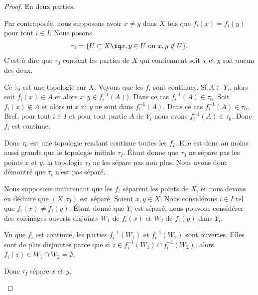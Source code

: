 \begin{proof}
	En deux parties.
	\begin{subproof}
		\spitem[\( \Rightarrow\)]
		Par contraposée, nous supposons avoir \( x\neq y\) dans \( X\) tels que \( f_i(x)=f_i(y)\) pour tout \( i\in I\). Nous posons
		\begin{equation}
			\tau_0=\{ U\subset X\tq x,y\in U\text{ ou }x,y\not\in U \}.
		\end{equation}
		C'est-à-dire que \( \tau_0\) contient les parties de \( X\) qui contiennent soit \( x\) et \( y\) soit aucun des deux.

		Ce \( \tau_0\) est une topologie sur \( X\). Voyons que les \( f_i\) sont continues. Si \( A\subset Y_i\), alors soit \( f_i(x)\in A\) et alors \( x,y\in f_i^{-1}(A))\). Dans ce cas \( f_i^{-1}(A)\in \tau_0\). Soit \( f_i(x)\not\in A\) et alors ni \( x\) ni \( y\) ne sont dans \( f_i^{-1}(A)\). Dans ce cas \( f_i^{-1}(A)\in \tau_0\). Bref, pour tout \( i\in I\) et pour tout partie \( A\) de \( Y_i\) nous avons \( f_i^{-1}(A)\in \tau_0\). Donc \( f_i\) est continue.

		Donc \( \tau_0\) est une topologie rendant continue toutes les \( f_I\). Elle est donc au moins aussi grande que le topologie initiale \( \tau_I\). Étant donne que \( \tau_0\) ne sépare pas les points \( x\) et \( y\), la topologie \( \tau_I\) ne les sépare pas non plus. Nous avons donc démontré que \( \tau_i\) n'est pas séparé.

		\spitem[\( \Leftarrow\)]
		Nous supposons maintenant que les \( f_i\) séparent les points de \( X\), et nous devons en déduire que \( (X,\tau_I)\) est séparé. Soient \( x,y\in X\). Nous considérons \( i\in I\) tel que \( f_i(x)\neq f_i(y)\). Étant donné que \( Y_i\) est séparé, nous pouvons considérer des voisinages ouverts disjoints \( W_1\) de \( f_i(x)\) et \( W_2\) de \( f_i(y)\) dans \( Y_i\).

		Vu que \( f_i\) est continue, les parties \( f_i^{-1}(W_1)\) et \( f_i^{-1}(W_2)\) sont ouvertes. Elles sont de plus disjointes parce que si \( z\in f_i^{-1}(W_1)\cap f_i^{-1}(W_2)\), alors \( f_i(z)\in W_1\cap W_2=\emptyset\).

		Donc \( \tau_I\) sépare \( x\) et \( y\).
	\end{subproof}
\end{proof}

